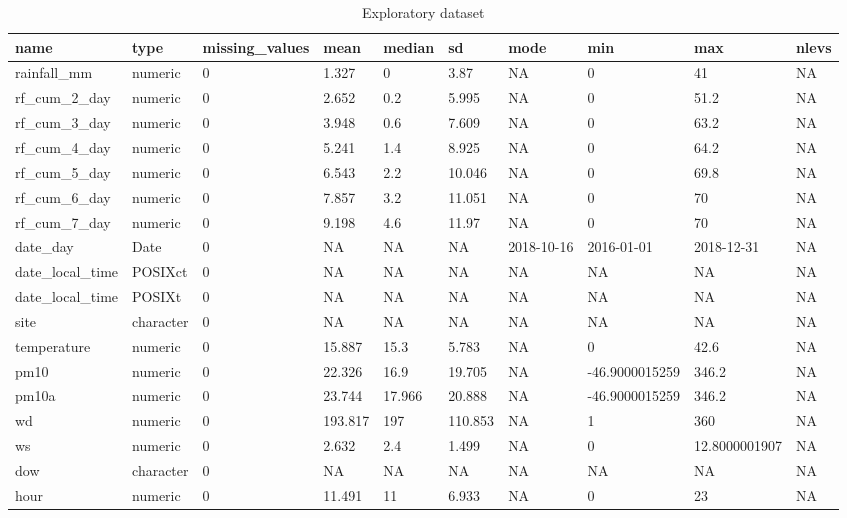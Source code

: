\documentclass[12pt]{article}
\begin{document}
\begin{table}

\caption{\label{tab:unnamed-chunk-16}Exploratory dataset}
\centering
\begin{tabu} to 
\hline
name & type & missing\_values & mean & median & sd & mode & min & max & nlevs\\
\hline
rainfall\_mm & numeric & 0 & 1.327 & 0 & 3.87 & NA & 0 & 41 & NA\\
\hline
rf\_cum\_2\_day & numeric & 0 & 2.652 & 0.2 & 5.995 & NA & 0 & 51.2 & NA\\
\hline
rf\_cum\_3\_day & numeric & 0 & 3.948 & 0.6 & 7.609 & NA & 0 & 63.2 & NA\\
\hline
rf\_cum\_4\_day & numeric & 0 & 5.241 & 1.4 & 8.925 & NA & 0 & 64.2 & NA\\
\hline
rf\_cum\_5\_day & numeric & 0 & 6.543 & 2.2 & 10.046 & NA & 0 & 69.8 & NA\\
\hline
rf\_cum\_6\_day & numeric & 0 & 7.857 & 3.2 & 11.051 & NA & 0 & 70 & NA\\
\hline
rf\_cum\_7\_day & numeric & 0 & 9.198 & 4.6 & 11.97 & NA & 0 & 70 & NA\\
\hline
date\_day & Date & 0 & NA & NA & NA & 2018-10-16 & 2016-01-01 & 2018-12-31 & NA\\
\hline
date\_local\_time & POSIXct & 0 & NA & NA & NA & NA & NA & NA & NA\\
\hline
date\_local\_time & POSIXt & 0 & NA & NA & NA & NA & NA & NA & NA\\
\hline
site & character & 0 & NA & NA & NA & NA & NA & NA & NA\\
\hline
temperature & numeric & 0 & 15.887 & 15.3 & 5.783 & NA & 0 & 42.6 & NA\\
\hline
pm10 & numeric & 0 & 22.326 & 16.9 & 19.705 & NA & -46.9000015259 & 346.2 & NA\\
\hline
pm10a & numeric & 0 & 23.744 & 17.966 & 20.888 & NA & -46.9000015259 & 346.2 & NA\\
\hline
wd & numeric & 0 & 193.817 & 197 & 110.853 & NA & 1 & 360 & NA\\
\hline
ws & numeric & 0 & 2.632 & 2.4 & 1.499 & NA & 0 & 12.8000001907 & NA\\
\hline
dow & character & 0 & NA & NA & NA & NA & NA & NA & NA\\
\hline
hour & numeric & 0 & 11.491 & 11 & 6.933 & NA & 0 & 23 & NA\\

\end{tabu}
\end{table}
\end{document}
